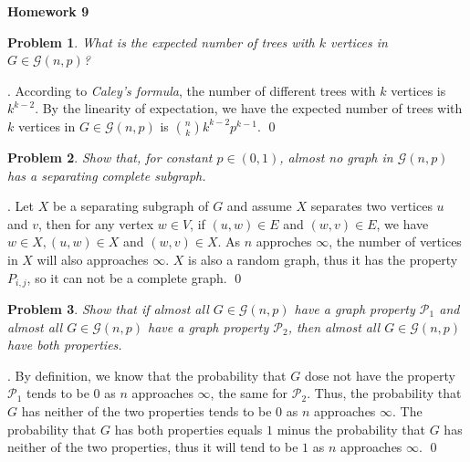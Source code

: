 \documentclass[12pt]{article}
\date{Feb 14, 2012}
\newtheorem{hw}{Problem}
\newenvironment{sol}
  {\par\vspace{3mm}\noindent{\it Solution}.}
  {\qed}
\begin{document}
\begin{center}
{\LARGE\bf Homework 9}\\
\vspace{2mm}
\end{center}

\begin{hw}
What is the expected number of trees with $k$ vertices in $G\in \mathcal{G}(n,p)$?
\end{hw}
\begin{sol}
	According to \emph{Caley’s formula}, the number of different trees with $k$ vertices is $k^{k-2}$. By the linearity of expectation, we have the expected number of trees with $k$ vertices in $G\in \mathcal{G}(n,p)$ is ${n \choose k}k^{k-2}p^{k-1}$.
\end{sol}


\begin{hw}
Show that, for constant $p\in(0,1)$, almost no graph in $\mathcal{G}(n,p)$ has a separating complete subgraph.
\end{hw}
\begin{sol}
	Let $X$ be a separating subgraph of $G$ and assume $X$ separates two vertices $u$ and $v$, then for any vertex $w\in V$, if $(u,w) \in E$ and $(w,v) \in E$, we have $w \in X, (u,w) \in X$ and $(w,v) \in X$. As $n$ approches $\infty$, the number of vertices in $X$ will also approaches $\infty$. $X$ is also a random graph, thus it has the property $P_{i,j}$, so it can not be a complete graph.
\end{sol}


\begin{hw}
Show that if almost all $G\in \mathcal{G}(n,p)$ have a graph property $\mathcal{P}_1$ and almost all $G\in \mathcal{G}(n,p)$ have a graph property $\mathcal{P}_2$, then almost all $G\in \mathcal{G}(n,p)$ have both properties.
\end{hw}
\begin{sol}
	By definition, we know that the probability that $G$ dose not have the property $\mathcal{P}_1$ tends to be $0$ as $n$ approaches $\infty$, the same for $\mathcal{P}_2$. Thus, the probability that $G$ has neither of the two properties tends to be $0$ as $n$ approaches $\infty$. The probability that $G$ has both properties equals $1$ minus the probability that $G$ has neither of the two properties, thus it will tend to be $1$ as $n$ approaches $\infty$.
\end{sol}
\end{document}
